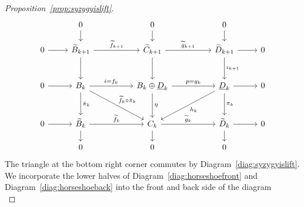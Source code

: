 \documentclass[12pt,a4paper]{article}
\numberwithin{equation}{section}
\theoremstyle{nonumberplain}
\newtheorem{proof}{Proof}
\begin{document}
\begin{proof}[Proposition~\ref{prop:syzygyislift}]
\begin{equation}\label{diag:horseshoefront}
\begin{tikzcd}[row sep = scriptsize]
  {}
    & 0 \arrow[d]
    & & 0 \arrow[d]
    & & 0 \arrow[d]
    & {} \\
  0 \arrow[r]
    & \widetilde{B}_{k+1} \arrow[rr, "\widetilde{f}_{k+1}"] \arrow[dd]
    & & \widetilde{C}_{k+1} \arrow[rr, "\widetilde{g}_{k+1}"] \arrow[dd]
    & & \widetilde{D}_{k+1} \arrow[r] \arrow[dd, "\iota_{k+1}"]
    & 0 \\ \\
  0 \arrow[r]
    & B_k \arrow[rr, "i = f_k"] \arrow[ddrr, "\widetilde{f}_k \circ \check{\pi}_k"] \arrow[dd, "\check{\pi}_k"]
    & & B_k \oplus \underline{D}_k \arrow[rr, "p = g_k"] \arrow[dd, "\eta"]
    & & \underline{D}_k \arrow[r] \arrow[ddll, "h_k"] \arrow[dd, "\pi_k"]
    & 0 \\ \\
  0 \arrow[r]
    & \widetilde{B}_k \arrow[rr, "\widetilde{f}_k"] \arrow[d]
    & & C_k \arrow[rr, "\widetilde{g}_k"] \arrow[d]
    & & \widetilde{D}_k \arrow[r] \arrow[d]
    & 0 \\
  {}
    & 0
    & & 0
    & & 0
    & {}
\end{tikzcd}
\end{equation}
The triangle at the bottom right corner commutes by Diagram~\ref{diag:syzygyislift}. We incorporate the lower halves of Diagram~\ref{diag:horseshoefront} and Diagram~\ref{diag:horseshoeback} into the front and back side of the diagram \\


\end{proof}
\end{document}
